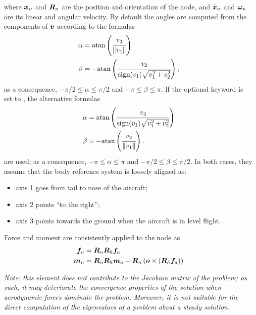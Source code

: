 where $\boldsymbol{x}_n$ and $\boldsymbol{R}_n$ are the position and orientation
of the node, and $\dot{\boldsymbol{x}}_n$ and $\boldsymbol{\omega}_n$ are its linear
and angular velocity.
By default the angles are computed from the components of $\boldsymbol{v}$
according to the formulas
\begin{subequations}
\begin{align}
	\alpha
	&=
	\text{atan}\left( 
		\cfrac{v_3}{\left\| v_1 \right\|}
	 \right)
	\\
	\beta
	&=
	-\text{atan}\left( 
		\cfrac{v_2}{\text{sign}(v_1)\sqrt{v_1^2 + v_2^2}}
	 \right)
	;
\end{align}
\end{subequations}
as a consequence, $-\pi/2 \le \alpha \le \pi/2$
and $-\pi \le \beta \le \pi$.
If the optional keyword  is set to ,
the alternative formulas
\begin{subequations}
\begin{align}
	\alpha
	&=
	\text{atan}\left( 
		\cfrac{v_3}{\text{sign}(v_1)\sqrt{v_1^2 + v_2^2}}
	 \right)
	\\
	\beta
	&=
	-\text{atan}\left( 
		\cfrac{v_2}{\left\| v_1 \right\|}
	 \right)
	.
\end{align}
\end{subequations}
are used; as a consequence, $-\pi \le \alpha \le \pi$
and $-\pi/2 \le \beta \le \pi/2$.
In both cases, they assume that the body reference system
is loosely aligned as:
\begin{itemize}
\item axis 1 goes from tail to nose of the aircraft;
\item axis 2 points ``to the right'';
\item axis 3 points towards the ground when the aircraft is in level flight.
\end{itemize}
Force and moment are consistently applied to the node as
\begin{subequations}
\begin{align}
	\boldsymbol{f}_n &= \boldsymbol{R}_n \boldsymbol{R}_h \boldsymbol{f}_a
	\\
	\boldsymbol{m}_n &= \boldsymbol{R}_n \boldsymbol{R}_h \boldsymbol{m}_a
		+ \boldsymbol{R}_n \left( \boldsymbol{o} \times \left( \boldsymbol{R}_h \boldsymbol{f}_a \right) \right)
\end{align}
\end{subequations}

\emph{Note: this element does not contribute to the Jacobian matrix
of the problem; as such, it may deteriorate the convergence properties
of the solution when aerodynamic forces dominate the problem.
Moreover, it is not suitable for the direct computation of the eigenvalues
of a problem about a steady solution.}

